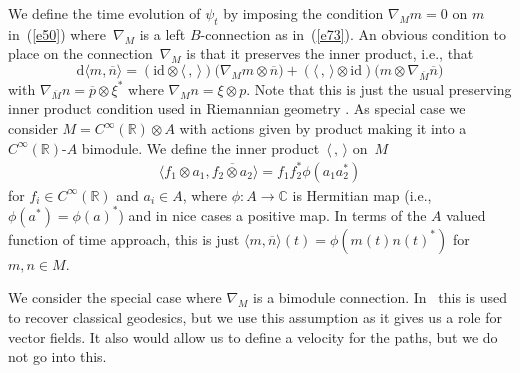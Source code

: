 \documentclass[10pt,a4paper]{amsart}
\numberwithin{equation}{section}
\newcommand{\id}{\mathrm{id}}
\newcommand{\extd}{\mathrm{d}}
\newcommand{\tens}{\mathop{\otimes}}
\newcommand{\R}{\mathbb{R}}
\newcommand{\C}{\mathbb{C}}
\newcommand{\<}{\langle}
\renewcommand{\>}{\rangle}
\begin{document}
We define the time evolution of $ \psi_t $ by imposing the condition $ \nabla _{M}m=0 $ on $ m $ in~(\ref{e50}) where~$ \nabla_{M} $ is a left $ B $-connection as in~(\ref{e73}). An obvious condition to place on the connection~$ \nabla_{M} $ is that it preserves the inner product, i.e., that
\begin{equation*}
\extd \langle m, \overline{n}\rangle= (\id \tens \langle\,,\,\rangle)\big(\nabla_{M} m \tens \overline{n}\big)+ (\langle\,,\,\rangle \tens \id)\big(m\tens \nabla_{\overline{M}} \overline{n}\big)
\end{equation*}
with $ \nabla_{\overline{M}} n=\overline{p} \tens \xi^{\ast}$ where $ \nabla_{M} n=\xi \tens p$. Note that this is just the usual preserving inner product condition used in Riemannian geometry \cite{BMbook}. As special case we consider $ M= C^{\infty}(\R) \tens A $ with actions given by product making it into a $ C^{\infty}(\R) $-$ A $ bimodule. We define the inner product~$ \langle\,,\,\rangle $ on~$ M $
\begin{align*}
	\< f_{1} \tens a_{1}, \overline{f_{2} \tens a_{2}} \>= f_{1} f_{2}^{*} \phi (a_{1}a_{2}^{*})
\end{align*}
for $ f_{i} \in C^{\infty }(\R) $ and $ a_{i} \in A $, where $ \phi\colon A\rightarrow \C $ is Hermitian map (i.e., $ \phi(a^{*})=\phi(a)^{*} $) and in nice cases a positive map. In terms of the $ A $ valued function of time approach, this is just $ \< m, \overline{n}\>(t)=\phi (m(t) n(t)^{*}) $ for $ m,n\in M $.

We consider the special case where $ \nabla_{M} $ is a bimodule connection. In~\cite{Bgeo} this is used to recover classical geodesics, but we use this assumption as it gives us a role for vector fields. It also would allow us to define a velocity for the paths, but we do not go into this.
\end{document}
